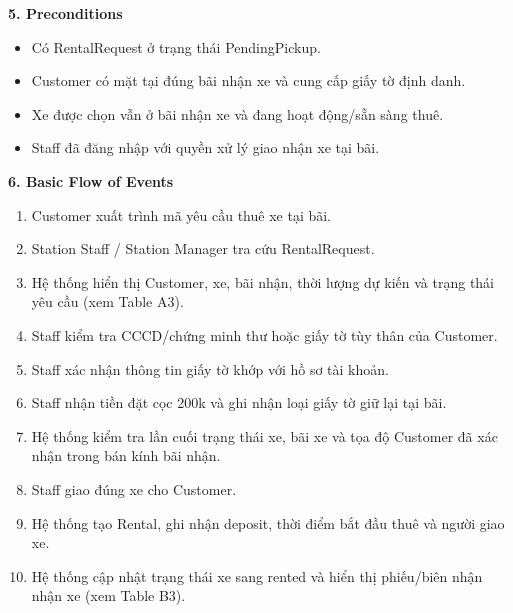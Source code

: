 \textbf{5. Preconditions}
\begin{itemize}
  \item Có RentalRequest ở trạng thái PendingPickup.
  \item Customer có mặt tại đúng bãi nhận xe và cung cấp giấy tờ định danh.
  \item Xe được chọn vẫn ở bãi nhận xe và đang hoạt động/sẵn sàng thuê.
  \item Staff đã đăng nhập với quyền xử lý giao nhận xe tại bãi.
\end{itemize}

\textbf{6. Basic Flow of Events}
\begin{enumerate}
  \item Customer xuất trình mã yêu cầu thuê xe tại bãi.
  \item Station Staff / Station Manager tra cứu RentalRequest.
  \item Hệ thống hiển thị Customer, xe, bãi nhận, thời lượng dự kiến và trạng thái yêu cầu (xem Table A3).
  \item Staff kiểm tra CCCD/chứng minh thư hoặc giấy tờ tùy thân của Customer.
  \item Staff xác nhận thông tin giấy tờ khớp với hồ sơ tài khoản.
  \item Staff nhận tiền đặt cọc 200k và ghi nhận loại giấy tờ giữ lại tại bãi.
  \item Hệ thống kiểm tra lần cuối trạng thái xe, bãi xe và tọa độ Customer đã xác nhận trong bán kính bãi nhận.
  \item Staff giao đúng xe cho Customer.
  \item Hệ thống tạo Rental, ghi nhận deposit, thời điểm bắt đầu thuê và người giao xe.
  \item Hệ thống cập nhật trạng thái xe sang rented và hiển thị phiếu/biên nhận nhận xe (xem Table B3).
\end{enumerate}

